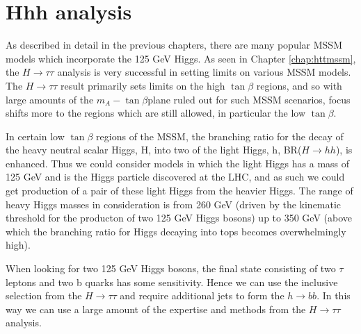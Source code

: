 \chapter{Hhh analysis}
\label{chap:Hhh}

As described in detail in the previous chapters, there are many popular MSSM
models which incorporate the 125 GeV Higgs. As seen in Chapter
\ref{chap:httmssm}, the $H\rightarrow\tau\tau$ analysis is very successful in 
setting limits on various MSSM models. The $H\rightarrow\tau\tau$ result primarily sets
limits on the high $\tan\beta$ regions, and so with large amounts of the
$m_{A}-\tan\beta$plane ruled out for such MSSM scenarios, focus shifts more 
to the regions which are still allowed, in particular the low $\tan\beta$.

In certain low $\tan\beta$ regions of the MSSM, the branching ratio for the
decay of the heavy neutral scalar Higgs, H, into two of the light Higgs, h,
BR($H\rightarrow hh$), is enhanced. Thus we could consider models in which the
light Higgs has a mass of 125 GeV and is the Higgs particle discovered at the
LHC, and as such we could get production of a pair of these light Higgs from the
heavier Higgs. The range of heavy Higgs masses in consideration is from 260 GeV
(driven by the kinematic threshold for the producton of two 125 GeV Higgs
bosons) up to 350 GeV (above which the branching ratio for Higgs decaying into
tops becomes overwhelmingly high).

When looking for two 125 GeV Higgs bosons, the final state consisting of two
$\tau$ leptons and two b quarks has some sensitivity. Hence we can use the
inclusive selection from the $H\rightarrow\tau\tau$ and require additional jets
to form the $h\rightarrow bb$. In this way we can use a large amount of the
expertise and methods from the $H\rightarrow\tau\tau$ analysis.


